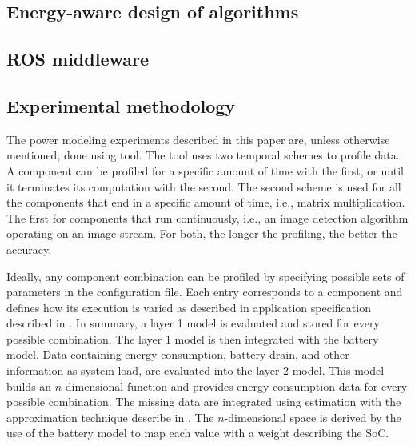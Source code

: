 \subsection{\color{red}Energy-aware design of algorithms}

\subsection{\color{red}ROS middleware}

\subsection{\color{cyan}Experimental methodology}


The power modeling experiments described in this paper are, unless otherwise mentioned, done using \powprof{} tool. The tool uses two temporal schemes to profile data. A component can be profiled for a specific amount of time with the first, or until it terminates its computation with the second. The second scheme is used for all the components that end in a specific amount of time, i.e., matrix multiplication. The first for components that run continuously, i.e., an image detection algorithm operating on an image stream. For both, the longer the profiling, the better the accuracy. 

Ideally, any component combination can be profiled by specifying possible sets of parameters in the configuration file. Each entry corresponds to a component and defines how its execution is varied as described in application specification described in . In summary, a layer 1 model is evaluated and stored for every possible combination. The layer 1 model is then integrated with the battery model. Data containing energy consumption, battery drain, and other information as system load, are evaluated into the layer 2 model. This model builds an $n$-dimensional function and provides energy consumption data for every possible combination. The missing data are integrated using estimation with the approximation technique describe in . The $n$-dimensional space is derived by the use of the battery model to map each value with a weight describing the SoC.

